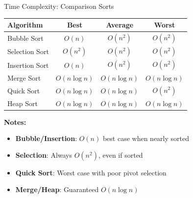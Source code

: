 \documentclass[aspectratio=169]{beamer}
\begin{document}
\begin{frame}{Time Complexity: Comparison Sorts}
  \begin{center}
  \begin{tabular}{|l|c|c|c|}
    \hline
    \textbf{Algorithm} & \textbf{Best} & \textbf{Average} & \textbf{Worst} \\
    \hline
    Bubble Sort & $O(n)$ & $O(n^2)$ & $O(n^2)$ \\
    \hline
    Selection Sort & $O(n^2)$ & $O(n^2)$ & $O(n^2)$ \\
    \hline
    Insertion Sort & $O(n)$ & $O(n^2)$ & $O(n^2)$ \\
    \hline
    Merge Sort & $O(n \log n)$ & $O(n \log n)$ & $O(n \log n)$ \\
    \hline
    Quick Sort & $O(n \log n)$ & $O(n \log n)$ & $O(n^2)$ \\
    \hline
    Heap Sort & $O(n \log n)$ & $O(n \log n)$ & $O(n \log n)$ \\
    \hline
  \end{tabular}
  \end{center}

  \vspace{0.3cm}
  \textbf{Notes:}
  \begin{itemize}
    \item \textbf{Bubble/Insertion}: $O(n)$ best case when nearly sorted
    \item \textbf{Selection}: Always $O(n^2)$, even if sorted
    \item \textbf{Quick Sort}: Worst case with poor pivot selection
    \item \textbf{Merge/Heap}: Guaranteed $O(n \log n)$
  \end{itemize}
\end{frame}
\end{document}
